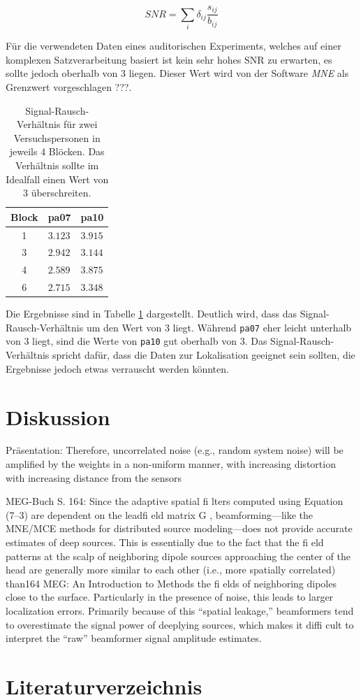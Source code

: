 \documentclass[doc,a4paper,12pt]{apa6}
\begin{document}
\begin{equation}
SNR = \sum_i \delta_{ij} \frac{s_{ij}}{b_{ij}}
\end{equation}

Für die verwendeten Daten eines auditorischen Experiments, welches auf einer komplexen Satzverarbeitung basiert ist kein sehr hohes SNR zu erwarten, es sollte jedoch oberhalb von $3$ liegen. Dieser Wert wird von der Software \emph{MNE} als Grenzwert vorgeschlagen ???.

\begin{table}[t]
\caption{}
\label{tab:snr}
\vspace*{3mm}
\begin{tabularx}{\textwidth}{cll}
Block & pa07 & pa10 \\
\hline
1 & $3.123$ & $3.915$\\
3 & $2.942$ & $3.144$\\
4 & $2.589$ & $3.875$\\
6 & $2.715$ & $3.348$\\
\hline
\end{tabularx}
\vspace*{3mm}
\caption*{Signal-Rausch-Verhältnis für zwei Versuchspersonen in jeweils 4 Blöcken. Das Verhältnis sollte im Idealfall einen Wert von $3$ überschreiten.}
\end{table}

Die Ergebnisse sind in Tabelle \ref{tab:snr} dargestellt. Deutlich wird, dass das Signal-Rausch-Verhältnis um den Wert von $3$ liegt. Während \texttt{pa07} eher leicht unterhalb von $3$ liegt, sind die Werte von \texttt{pa10} gut oberhalb von $3$. Das Signal-Rausch-Verhältnis spricht dafür, dass die Daten zur Lokalisation geeignet sein sollten, die Ergebnisse jedoch etwas verrauscht werden könnten.

\section{Diskussion}
\label{sec:diskussion}

Präsentation: Therefore, uncorrelated noise (e.g., random system noise) will be amplified by the weights in a non-uniform manner, with increasing distortion with increasing distance from the sensors 

MEG-Buch S. 164: Since the adaptive spatial fi lters computed using Equation (7–3) are dependent on the leadfi eld matrix G , beamforming—like the MNE/MCE methods for distributed source modeling—does not provide accurate estimates of deep sources. This is essentially due to the fact that the fi eld patterns at the scalp of neighboring dipole sources approaching the center of the head are generally more similar to each other (i.e., more spatially correlated) than164
MEG: An Introduction to Methods the fi elds of neighboring dipoles close to the surface. Particularly in the presence of noise, this leads to larger localization errors. Primarily because of this “spatial leakage,” beamformers tend to overestimate the signal power of deeplying sources, which makes it diffi cult to interpret the “raw” beamformer signal amplitude estimates.

\newpage
\section{Literaturverzeichnis}

\printbibliography[heading=none]

%
\end{document}

